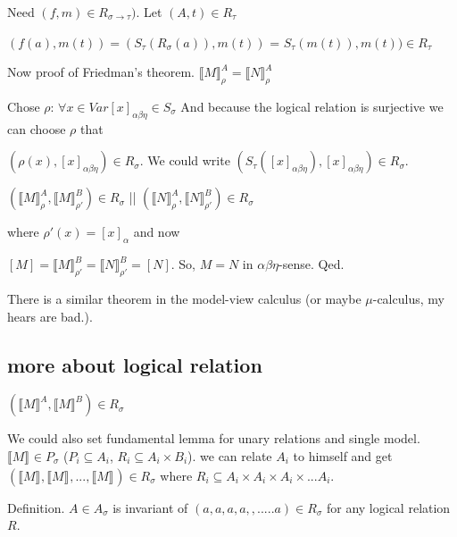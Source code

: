 \documentclass[a4paper,10pt]{book}
\newcommand{\sem}[2]{ \llbracket#1\rrbracket_{#2} }
\begin{document}


Need $(f,m) \in R_{\sigma \rightarrow \tau})$. Let $(A,t) \in R_\tau$

$(f(a), m(t)) = (S_\tau(R_\sigma(a)), m(t))$ = $S_\tau(m(t)), m(t)) \in R_\tau$

Now proof of Friedman's theorem.
$\sem{M}{\rho}^A = \sem{N}{\rho}^A$

Chose $\rho$: $\forall x \in Var      [x]_{\alpha\beta\eta} \in S_\sigma$
And because the logical relation is surjective  we can choose $\rho$ that

$(\rho(x), [x]_{\alpha\beta\eta}) \in R_\sigma$. We could write
$(S_\tau([x]_{\alpha\beta\eta}), [x]_{\alpha\beta\eta}) \in R_\sigma$.


$( \sem{M}{\rho}^A, \sem{M}{\rho'}^B ) \in R_\sigma$
     ||
$( \sem{N}{\rho}^A, \sem{N}{\rho'}^B ) \in R_\sigma$     

where $\rho'(x) = [x]_{\alpha}$ and now

$[M] = \sem{M}{\rho'}^B = \sem{N}{\rho'}^B = [N]$. So, $M=N$ in $\alpha\beta\eta$-sense. Qed.

There is a similar theorem in the model-view calculus (or maybe $\mu$-calculus, my hears are bad.).


\subsection{more about logical relation}

$(\sem{M}{}^A, \sem{M}{}^B) \in R_\sigma$

We could also set fundamental lemma for unary relations and single model.
$\sem{M}{} \in P_\sigma$ ($P_i \subseteq A_i$, $R_i \subseteq A_i \times B_i$). we can relate $A_i$ to himself
and get $(\sem{M}{}, \sem{M}{}, ..., \sem{M}{}) \in R_\sigma$ where $R_i \subseteq A_i \times A_i \times A_i \times ... A_i$.

Definition. $A\in A_\sigma$ is invariant of $(a,a,a,a,,.....a) \in R_\sigma$ for any logical relation $R$.
\end{document}
